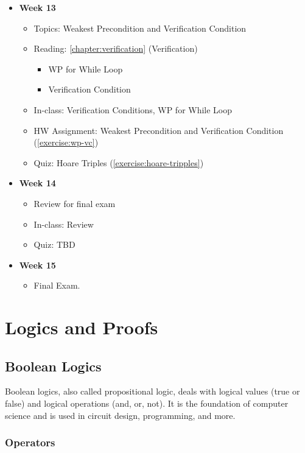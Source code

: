 \documentclass[oneside,11pt,dvipsnames]{book}
\begin{document}
\begin{itemize}
    \item \textbf{Week 13}
    \begin{itemize}
        \item Topics: Weakest Precondition and Verification Condition
        \item Reading: \autoref{chapter:verification} (Verification)
        \begin{itemize}
            \item WP for While Loop
            \item Verification Condition
        \end{itemize}
        \item In-class: Verification Conditions, WP for While Loop
        \item HW Assignment: Weakest Precondition and Verification Condition (\autoref{exercise:wp-vc})
        \item Quiz: Hoare Triples (\autoref{exercise:hoare-tripples})
    \end{itemize}

    \item \textbf{Week 14}
    \begin{itemize}
        \item Review for final exam
        \item In-class: Review
        \item Quiz: TBD
    \end{itemize}

    \item \textbf{Week 15}
    \begin{itemize}
        \item Final Exam.
    \end{itemize}
\end{itemize}

\chapter{Logics and Proofs}

\section{Boolean Logics}

Boolean logics, also called propositional logic, deals with logical values (true or false) and logical operations (and, or, not). It is the foundation of computer science and is used in circuit design, programming, and more. 

\subsection{Operators}
\end{document}
